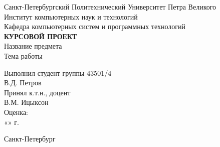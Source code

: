 
	\begin{center}		%

		\large Санкт-Петербургский Политехнический Университет Петра Великого\\
		\large Институт компьютерных наук и технологий \\
		\large Кафедра компьютерных систем и программных технологий\\[6cm]
		
		\huge \textbf{КУРСОВОЙ ПРОЕКТ}\\[0.5cm]
		\large Название предмета\\[0.1cm]
		\large Тема работы\\[5cm]

	\end{center}


	\begin{flushright} %

				\large Выполнил студент группы 43501/4\\
				\large В.Д. Петров\\[0.5cm]
				
				\large Принял к.т.н., доцент\\
				\sign[4cm]\large  В.М. Ицыксон\\
				\large Оценка: \sign\\
				«\underline{\hspace{0.7cm}}» \underline{\hspace{2cm}} \the\year г.

	\end{flushright}
	
	\vfill %

	\begin{center}
	\large Санкт-Петербург\\
	\large \the\year %
	\end{center} %

\thispagestyle{empty} %
\newpage
